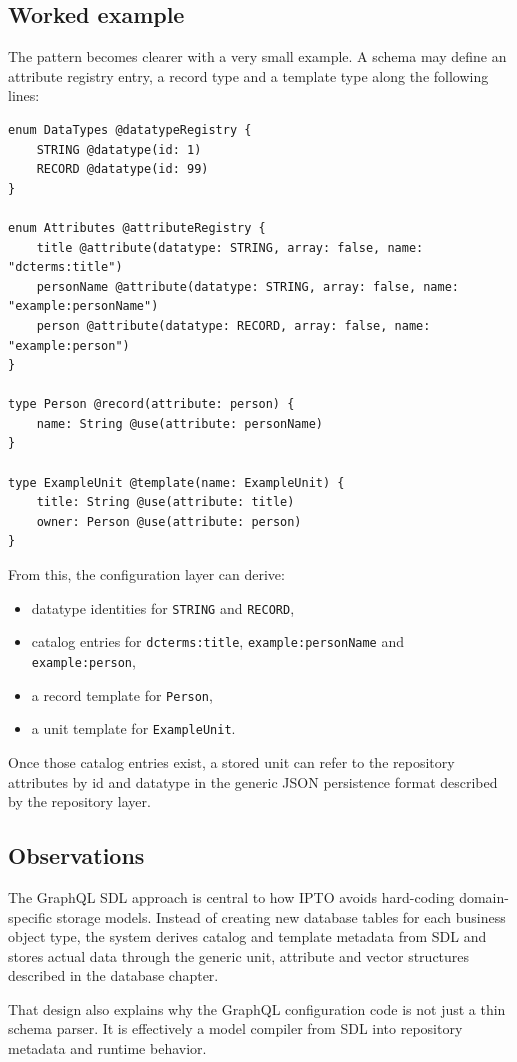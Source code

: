 \subsection{Worked example}

The pattern becomes clearer with a very small example. A schema may define an attribute registry entry, a record type and a template type along the following lines:

\begin{lstlisting}[style=GraphQL]
enum DataTypes @datatypeRegistry {
    STRING @datatype(id: 1)
    RECORD @datatype(id: 99)
}

enum Attributes @attributeRegistry {
    title @attribute(datatype: STRING, array: false, name: "dcterms:title")
    personName @attribute(datatype: STRING, array: false, name: "example:personName")
    person @attribute(datatype: RECORD, array: false, name: "example:person")
}

type Person @record(attribute: person) {
    name: String @use(attribute: personName)
}

type ExampleUnit @template(name: ExampleUnit) {
    title: String @use(attribute: title)
    owner: Person @use(attribute: person)
}
\end{lstlisting}

From this, the configuration layer can derive:
\begin{itemize}
\item datatype identities for \texttt{STRING} and \texttt{RECORD},
\item catalog entries for \texttt{dcterms:title}, \texttt{example:personName} and \texttt{example:person},
\item a record template for \texttt{Person},
\item a unit template for \texttt{ExampleUnit}.
\end{itemize}

Once those catalog entries exist, a stored unit can refer to the repository attributes by id and datatype in the generic JSON persistence format described by the repository layer.

\subsection{Observations}

The GraphQL SDL approach is central to how IPTO avoids hard-coding domain-specific storage models. Instead of creating new database tables for each business object type, the system derives catalog and template metadata from SDL and stores actual data through the generic unit, attribute and vector structures described in the database chapter.

That design also explains why the GraphQL configuration code is not just a thin schema parser. It is effectively a model compiler from SDL into repository metadata and runtime behavior.
